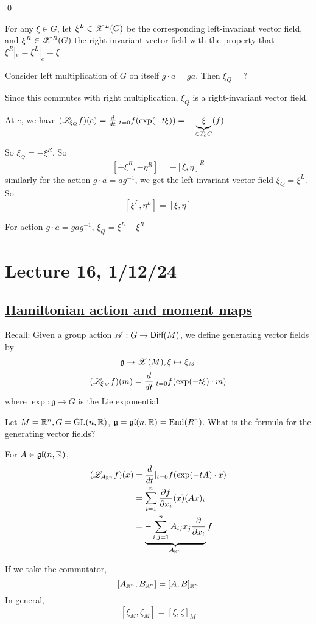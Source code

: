 \documentclass[x11names,reqno,14pt]{extarticle}
\newcommand{\mk}[1]{\mathfrak{#1}}
\newcommand{\g}{\mk{g}}
\newcommand{\dd}[2]{\frac{d#1}{d#2}}
\newcommand{\pp}[2]{\frac{\partial #1}{\partial #2}}
\newcommand{\gl}{\mk{g}\mk{l}}
\begin{document}
\proof

\qed


For any $\xi\in G$, let $\xi^L\in\mathscr{X}^L(G)$ be the corresponding left-invariant vector field, and $\xi^R \in \mathscr{X}^R(G)$ the right invariant vector field with the property that $\xi^R|_e = \xi^L|_e = \xi$

\exm

Consider left multiplication of $G$ on itself $g\cdot a = ga$. Then $\xi_Q = ?$

Since this commutes with right multiplication, $\xi_Q$ is a right-invariant vector field. 

At $e$, we have $(\ms{L}_{\xi_Q}f)(e) = \dd{}{t}|_{t=0}f(\exp(-t\xi)) = -\underbrace{\xi}_{\in T_eG}(f)$

So $\xi_Q = -\xi^R$. So 
\[
[-\xi^R,-\eta^R] = -[\xi,\eta]^R
\]
similarly for the action $g\cdot a = ag^{-1}$, we get the left invariant vector field $\xi_Q = \xi^L$. So 
\[
[\xi^L,\eta^L] = [\xi,\eta]
\]

For action $g\cdot a = gag^{-1}$, $\xi_Q = \xi^L-\xi^R$

\section*{Lecture 16, 1/12/24}

\subsection*{\underline{Hamiltonian action and moment maps}}

\underline{Recall:} Given a group action $\mathscr{A}:G\to{{\text{\sffamily {Diff}}}}(M)$, we define generating vector fields by 
\[
\g \to \ms{X}(M), \xi \mapsto \xi_M
\]
\[
(\ms{L}_{\xi_M}f)(m) = \dd{}{t}|_{t=0}f(\exp(-t\xi)\cdot m)
\]
where $\exp:\g\to G$ is the Lie exponential.

\exm

Let $M = \mathbb{R}^n, G = {\mathrm{GL}}(n,\mathbb{R})$, $\g = \gl(n,\R) = \End(R^n)$. What is the formula for the generating vector fields? 

For $A \in \gl(n,\R)$, 
\begin{align*}
(\ms{L}_{A_{\R^n}}f)(x) & = \dd{}{t}|_{t=0}f(\exp(-tA)\cdot x) \\
& = \sum_{i=1}^n\pp{f}{x_i}(x)(Ax)_i \\
& = \underbrace{-\sum_{i,j=1}^n A_{ij}x_j\pp{}{x_i}}_{A_{\R^n}}f
\end{align*}

If we take the commutator, 
\[
[A_{\mathbb{R}^n},B_{\mathbb{R}^n}] = [A,B]_{\mathbb{R}^n}
\]
In general, 
\[
[\xi_M,\zeta_M] = [\xi,\zeta]_M
\]
\end{document}
